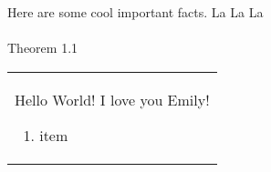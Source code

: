 \documentclass{article}
\begin{document}
    \colorbox{greenbg}{Here are some cool important facts. La La La}\\\\
    \textcolor{greenbar}{Theorem 1.1}

    \begin{tabular}{ !{\color{greenbar}\vrule width 3pt}p{\textwidth} }
        {
            {\color{greenbar} Hello World!} I love you Emily!
            \begin{enumerate}
                \item item
            \end{enumerate}
        }
    \end{tabular}
\end{document}
